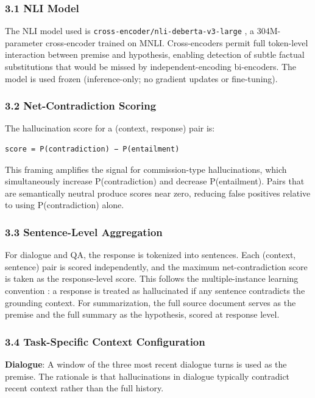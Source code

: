
\subsubsection{3.1 NLI Model}

The NLI model used is \texttt{cross-encoder/nli-deberta-v3-large} \citep{He2021DeBERTaV3}, a 304M-parameter cross-encoder trained on MNLI. Cross-encoders permit full token-level interaction between premise and hypothesis, enabling detection of subtle factual substitutions that would be missed by independent-encoding bi-encoders. The model is used frozen (inference-only; no gradient updates or fine-tuning).

\subsubsection{3.2 Net-Contradiction Scoring}

The hallucination score for a (context, response) pair is:

\begin{verbatim}
score = P(contradiction) − P(entailment)
\end{verbatim}

This framing amplifies the signal for commission-type hallucinations, which simultaneously increase P(contradiction) and decrease P(entailment). Pairs that are semantically neutral produce scores near zero, reducing false positives relative to using P(contradiction) alone.

\subsubsection{3.3 Sentence-Level Aggregation}

For dialogue and QA, the response is tokenized into sentences. Each (context, sentence) pair is scored independently, and the maximum net-contradiction score is taken as the response-level score. This follows the multiple-instance learning convention \citep{Laban2022SummaC}: a response is treated as hallucinated if any sentence contradicts the grounding context. For summarization, the full source document serves as the premise and the full summary as the hypothesis, scored at response level.

\subsubsection{3.4 Task-Specific Context Configuration}

\textbf{Dialogue}: A window of the three most recent dialogue turns is used as the premise. The rationale is that hallucinations in dialogue typically contradict recent context rather than the full history.

